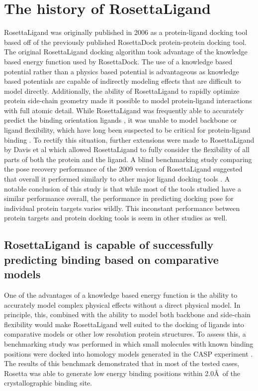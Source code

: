 \section{The history of RosettaLigand}
RosettaLigand was originally published in 2006 \citep{Meiler:2006vj} as a protein-ligand docking tool based off of the previously published RosettaDock \citep{Gray:2003uk} protein-protein docking tool.
The original RosettaLigand docking algorithm took advantage of the knowledge based energy function used by RosettaDock.
The use of a knowledge based potential rather than a physics based potential is advantageous as knowledge based potentials are capable of indirectly modeling effects that are difficult to model directly. %
Additionally, the ability of RosettaLigand to rapidly optimize protein side-chain geometry \citep{Barth:2007cw} made it possible to model protein-ligand interactions with full atomic detail.
While RosettaLigand was frequently able to accurately predict the binding orientation ligands \citep{Meiler:2006vj}, it was unable to model backbone or ligand flexibility, which have long been suspected to be critical for protein-ligand binding \citep{Yang:2014dm,KOSHLAND:1958wa}.
To rectify this situation, further extensions were made to RosettaLigand by Davis et al \citep{Davis:2009bf} which allowed RosettaLigand to fully consider the flexibility of all parts of both the protein and the ligand.
A blind benchmarking study comparing the pose recovery performance of the 2009 version of RosettaLigand suggested that overall it performed similarly to other major ligand docking tools \citep{Davis:2009fx}.
A notable conclusion of this study is that while most of the tools studied have a similar performance overall, the performance in predicting docking pose for individual protein targets varies wildly.
This inconstant performance between protein targets and protein docking tools is seem in other studies as well.

\subsection{RosettaLigand is capable of successfully predicting binding based on comparative models}
One of the advantages of a knowledge based energy function is the ability to accurately model complex physical effects without a direct physical model.
In principle, this, combined with the ability to model both backbone and side-chain flexibility would make RosettaLigand well suited to the docking of ligands into comparative models or other low resolution protein structures.
To assess this, a benchmarking study was performed in which small molecules with known binding positions were docked into homology models generated in the \ac{CASP} experiment \citep{Kaufmann:2012ck}.
The results of this benchmark demonstrated that in most of the tested cases, Rosetta was able to generate low energy binding positions within 2.0\AA\ of the crystallographic binding site.

